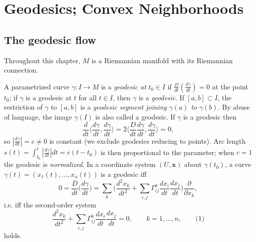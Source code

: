 \chapter{Geodesics; Convex Neighborhoods}
\label{chap:dc-geodesics-convex-neighborhoods}

\section{The geodesic flow}

Throughout this chapter, $M$ is a Riemannian manifold with its Riemannian
connection.

\begin{definition}[geodesic]
  \label{def:dc-ch3-2-1}


  A parametrized curve $\gamma:I\to M$ is a \emph{geodesic at} $t_0\in I$ if
  $\frac{D}{dt}\left(\frac{d\gamma}{dt}\right)=0$ at the point $t_0$; if $\gamma$ is
  a geodesic at $t$ for all $t\in I$, then $\gamma$ is a \emph{geodesic}. If
  $[a,b]\subset I$, the restriction of $\gamma$ to $[a,b]$ is a \emph{geodesic segment joining $\gamma(a)$ to $\gamma(b)$}. By abuse of language, the image $\gamma(I)$
  is also called a geodesic.
  If $\gamma$ is a geodesic then
  $$
  \frac{d}{dt}\Big\langle\frac{d\gamma}{dt},\frac{d\gamma}{dt}\Big\rangle=2\Big\langle\frac{D}{dt}\frac{d\gamma}{dt},\frac{d\gamma}{dt}\Big\rangle=0,
  $$
  so $\left|\frac{d\gamma}{dt}\right|=c\neq 0$ is constant (we exclude geodesics
  reducing to points). Arc length $s(t)=\int_{t_0}^t\left|\frac{d\gamma}{dt}\right|dt=c(t-t_0)$
  is then proportional to the parameter; when $c=1$ the geodesic is \emph{normalized}.
  In a coordinate system $(U,\mathbf{x})$ about $\gamma(t_0)$, a curve
  $\gamma(t)=(x_1(t),\dots,x_n(t))$ is a geodesic iff
  $$
  0=\frac{D}{dt}\Big(\frac{d\gamma}{dt}\Big)=\sum_k\Big(\frac{d^2x_k}{dt^2}+\sum_{i,j}\Gamma_{ij}^k\frac{dx_i}{dt}\frac{dx_j}{dt}\Big)\frac{\partial}{\partial x_k},
  $$
  i.e. iff the second-order system
  $$
  \frac{d^2x_k}{dt^2}+\sum_{i,j}\Gamma_{ij}^k\frac{dx_i}{dt}\frac{dx_j}{dt}=0,\qquad k=1,\dots,n,\qquad\text{(1)}
  $$
  holds.

\end{definition}

